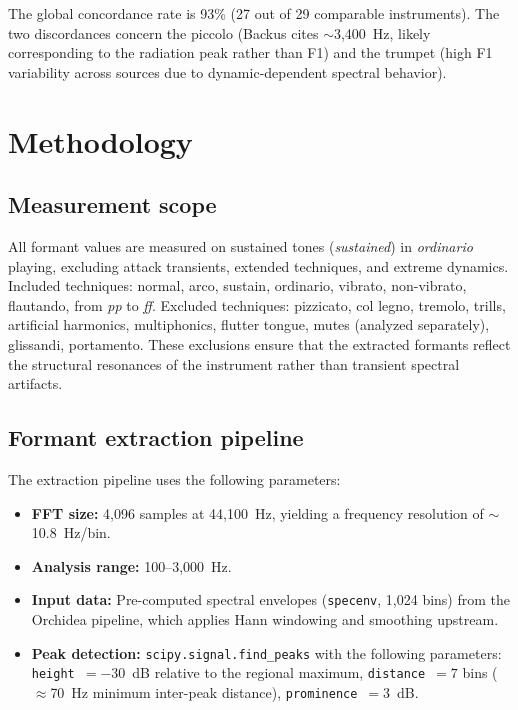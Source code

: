 \documentclass[12pt,a4paper]{article}
\begin{document}
The global concordance rate is 93\% (27 out of 29 comparable instruments). The two
discordances concern the piccolo (Backus cites $\sim$3,400~Hz, likely corresponding
to the radiation peak rather than F1) and the trumpet (high F1 variability across
sources due to dynamic-dependent spectral behavior).

\section{Methodology}
\label{sec:methodology}

\subsection{Measurement scope}

All formant values are measured on sustained tones (\emph{sustained}) in
\emph{ordinario} playing, excluding attack transients, extended techniques, and
extreme dynamics. Included techniques: normal, arco, sustain, ordinario,
vibrato, non-vibrato, flautando, from \emph{pp} to \emph{ff}. Excluded
techniques: pizzicato, col legno, tremolo, trills, artificial harmonics,
multiphonics, flutter tongue, mutes (analyzed separately), glissandi,
portamento. These exclusions ensure that the extracted formants reflect the
structural resonances of the instrument rather than transient spectral artifacts.

\subsection{Formant extraction pipeline}

The extraction pipeline uses the following parameters:

\begin{itemize}
\item \textbf{FFT size:} 4,096 samples at 44,100~Hz, yielding a frequency resolution
of $\sim$10.8~Hz/bin.
\item \textbf{Analysis range:} 100--3,000~Hz.
\item \textbf{Input data:} Pre-computed spectral envelopes (\texttt{specenv}, 1,024
bins) from the Orchidea pipeline, which applies Hann windowing and smoothing
upstream.
\item \textbf{Peak detection:} \texttt{scipy.signal.find\_peaks} with the following
parameters: \texttt{height}~$= -30$~dB relative to the regional maximum,
\texttt{distance}~$= 7$ bins ($\approx$70~Hz minimum inter-peak distance),
\texttt{prominence}~$= 3$~dB.
\end{itemize}
\end{document}
